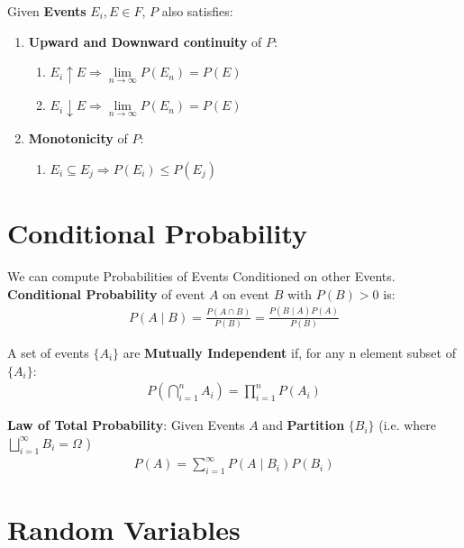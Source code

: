 \documentclass[a4paper,portrait,columns=2]{cheatsheet}
\begin{document}
Given \textbf{Events} \(E_i, E \in F\), $P$ also satisfies:
\begin{enumerate}
\item \textbf{Upward and Downward continuity} of \(P\):
	\begin{enumerate}
	\item \(E_i \uparrow E \Rightarrow \lim\limits_{n\to\infty} P(E_n) = P(E) \)
	\item \(E_i \downarrow E \Rightarrow \lim\limits_{n\to\infty} P(E_n) = P(E) \)
	\end{enumerate}
\item \textbf{Monotonicity} of \(P\):
        \begin{enumerate}
        	\item \( E_i \subseteq E_j \Rightarrow P(E_i) \le P(E_j)\)
        \end{enumerate}
\end{enumerate}

\section{Conditional Probability}
We can compute Probabilities of Events Conditioned on other Events. \\
\textbf{Conditional Probability} of event \(A\) on event \(B\) with \(P(B) > 0\) is:
\begin{align*}
P(A \mid B) = \frac{P(A \cap B)}{P(B)} = \frac{P(B \mid A)P(A)}{P(B)}
\end{align*}

A set of events \(\{A_i\}\) are \textbf{Mutually Independent} if, for any n element subset of \(\{A_i\}\):
\begin{align*}
P \left( \bigcap_{i=1}^{n} A_i \right) = \prod_{i=1}^{n}P(A_i) 
\end{align*}

\textbf{Law of Total Probability}: Given Events \(A\) and \textbf{Partition} \(\{B_i\}\) (i.e. where \(\bigsqcup_{i=1}^{\infty} B_i = \Omega \) )
\begin{align*}
P(A) = \sum_{i=1}^{\infty} P(A \mid B_i)P(B_i)
\end{align*}



\section{Random Variables}
\end{document}
